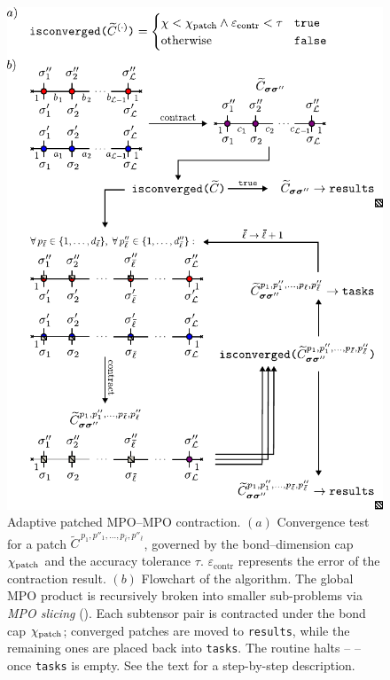 \begin{figure}[ht!]
    \centering
    \includegraphics{figures/AdaptivePatchContr.pdf}
    \caption{Adaptive patched MPO–MPO contraction. $(a)$ Convergence test for a patch
    \(\widetilde{C}^{\,p_1,p''_1,\dots,p_{\bar\ell},p''_{\bar\ell}}\), governed by the bond–dimension cap \(\chi_{\text{patch}}\) and the accuracy tolerance \(\tau\). $\varepsilon_{\text{contr}}$ represents the error of the contraction result. $(b)$ Flowchart of the algorithm.
    The global MPO product is recursively broken into smaller sub-problems via \emph{MPO slicing}
    ().
    Each subtensor pair is contracted under the bond cap $\chi_{\text{patch}}$; converged patches are moved to \texttt{results}, while the remaining ones are
    placed back into \texttt{tasks}.
    The routine halts --  -- once \texttt{tasks} is empty. See the text for a step-by-step description.}
    \label{fig:adaptiveMatMul}
\end{figure}

